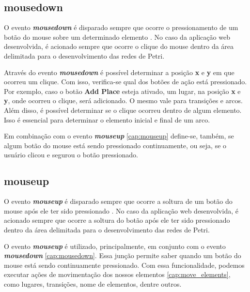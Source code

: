 \documentclass[
	12pt,				%
	openright,			%
	oneside,			%
	a4paper,			%
	english,			%
	brazil				%
	]{abntex2}
\begin{document}
\subsection*{mousedown}\label{cap:mousedown}

O evento \textbf{\textit{mousedown}} é disparado sempre que ocorre o pressionamento de um botão do mouse sobre um determinado elemento \cite{mdn_mousedown_event}. No caso da aplicação web desenvolvida, é acionado sempre que ocorre o clique do mouse dentro da área delimitada para o desenvolvimento das redes de Petri. 



Através do evento \textbf{\textit{mousedown}} é possível determinar a posição \textbf{x} e \textbf{y} em que ocorreu um clique. Com isso, verifica-se qual dos botões de ação está pressionado. Por exemplo, caso o botão \textbf{Add Place} esteja ativado, um lugar, na posição \textbf{x} e \textbf{y}, onde ocorreu o clique, será adicionado. O mesmo vale para transições e arcos. Além disso, é possível determinar se o clique ocorreu dentro de algum elemento. Isso é essencial para determinar o elemento inicial e final de um arco. 

Em combinação com o evento \textbf{\textit{mouseup}} \ref{cap:mouseup} define-se, também, se algum botão do mouse está sendo pressionado continuamente, ou seja, se o usuário clicou e segurou o botão pressionado. 

\subsection*{mouseup}\label{cap:mouseup}

O evento \textbf{\textit{mouseup}} é disparado sempre que ocorre a soltura de um botão do mouse após ele ter sido pressionado \cite{mdn_mouseup_event}. No caso da aplicação web desenvolvida, é acionado sempre que ocorre a soltura do botão após ele ter sido pressionado dentro da área delimitada para o desenvolvimento das redes de Petri.



O evento \textbf{\textit{mouseup}} é utilizado, principalmente, em conjunto com o evento \textbf{\textit{mousedown}} \ref{cap:mousedown}. Essa junção permite saber quando um botão do mouse está sendo continuamente pressionado. Com essa funcionalidade, podemos executar ações de movimentação dos nossos elementos \ref{cap:move_elements}, como lugares, transições, nome de elementos, dentre outros. 
\end{document}
